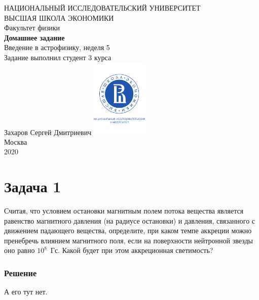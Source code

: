 \documentclass[a4paper, 12pt]{article}
\begin{document}
	\begin{titlepage}
		\begin{center}
			$$$$
			$$$$
			$$$$
			$$$$
			{\Large{НАЦИОНАЛЬНЫЙ ИССЛЕДОВАТЕЛЬСКИЙ УНИВЕРСИТЕТ}}\\
			\vspace{0.1cm}
			{\Large{ВЫСШАЯ ШКОЛА ЭКОНОМИКИ}}\\
			\vspace{0.25cm}
			{\large{Факультет физики}}\\
			\vspace{5.5cm}
			{\Huge\textbf{{Домашнее задание}}}\\%
			\vspace{1cm}
			{\LARGE{Введение в астрофизику, неделя 5}}\\%
			\vspace{2cm}
			{Задание выполнил студент 3 курса}\\
			{Захаров Сергей Дмитриевич}
			\vfill
			\includegraphics[width = 0.2\textwidth]{HSElogo}\\
			\vfill
			Москва\\
			2020
		\end{center}
	\end{titlepage}

\section*{Задача 1}

Считая, что условием остановки магнитным полем потока вещества является равенство магнитного давления (на радиусе остановки) и давления, связанного с движением падающего вещества, определите, при каком темпе аккреции можно пренебречь влиянием магнитного поля, если на поверхности нейтронной звезды оно равно $10^8$~Гс. Какой будет при этом аккреционная светимость?

\subsubsection*{Решение}

А его тут нет.
\end{document}
